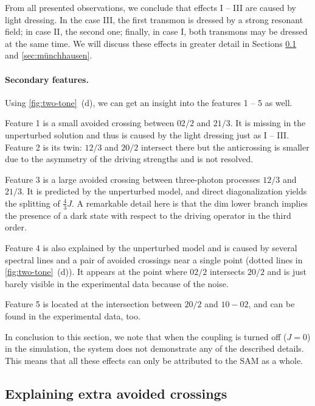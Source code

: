 \documentclass[%
 aps, prx,
 amsmath,amssymb,
 reprint,%
superscriptaddress
]{revtex4-2}
\begin{document}
From all presented observations, we conclude that effects I -- III 
are caused by light dressing. In the case III, the 
first transmon is dressed by a strong resonant 
field; in case II, the second one; finally, in 
case I, both transmons may be dressed at the same 
time. We will discuss these effects in greater 
detail in Sections \ref{sec:theory} and \ref{sec:münchhausen}.

\paragraph{Secondary features.} Using 
\autoref{fig:two-tone}~(d), we can get an insight 
into the features 1 -- 5 as well. 

Feature 1 is a small avoided crossing between 
${02/2}$ and ${21/3}$. It is missing in the 
unperturbed solution and thus is caused by the 
light dressing just as I -- III. Feature 2 is its 
twin: ${12/3}$ and ${20/2}$ intersect there but 
the anticrossing is smaller due to the asymmetry 
of the driving strengths and is not resolved. 

Feature 3 is a large avoided crossing between 
three-photon processes ${12/3}$ and ${21/3}$. It 
is predicted by the unperturbed model, and direct 
diagonalization yields the splitting of 
$\frac{4}{3}J$. A remarkable detail here is that 
the dim lower branch implies the presence of a 
dark state with respect to the driving operator 
in the third order. 

Feature 4 is also explained by the unperturbed 
model and is caused by several spectral lines and 
a pair of avoided crossings near a single point 
(dotted lines in \autoref{fig:two-tone}~(d)). It 
appears at the point where ${02/2}$ intersects 
${20/2}$ and is just barely visible in the 
experimental data because of the noise. 

Feature 5 is located at the intersection between ${20/2}$ 
and ${10} - {02}$, and can be 
found in the experimental data, too. 

In conclusion to this section, we note that when the coupling is turned off ($J=0$) in the simulation, the system does not demonstrate any of the described details. This means that all these effects can only be attributed to the SAM as a whole. 

\subsection{Explaining extra avoided crossings}\label{sec:theory}
\end{document}
